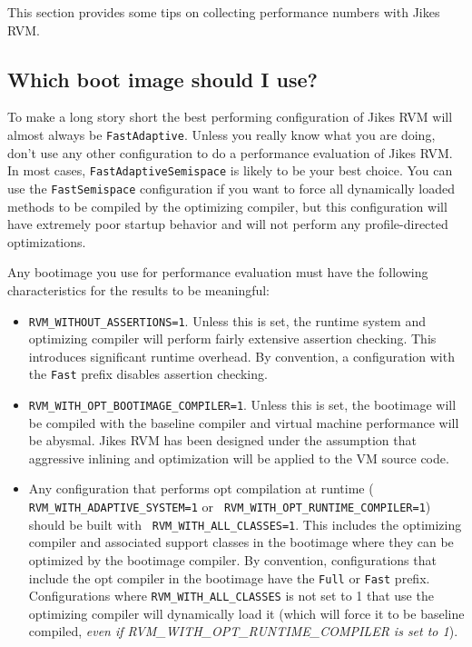 This section provides some tips on collecting performance numbers with
Jikes RVM.

\subsection{Which boot image should I use?}

To make a long story short the best performing configuration of Jikes
RVM will almost always be {\tt FastAdaptive}{\em<some GC>}.  Unless you really
know what you are doing, don't use any other configuration to do a 
performance evaluation of Jikes RVM. In most cases,
{\tt FastAdaptiveSemispace} is likely to be your best choice. You can
use the {\tt FastSemispace} configuration if you want to force all
dynamically loaded methods to be compiled by the optimizing compiler,
but this configuration will have extremely poor startup behavior and
will not perform any profile-directed optimizations. 

Any bootimage you use for performance evaluation must have the
following characteristics for the results to be meaningful:
\begin{itemize} 
\item {\tt RVM\_WITHOUT\_ASSERTIONS=1}. Unless this is set, the runtime
system and optimizing compiler will perform fairly extensive assertion
checking. This introduces significant runtime overhead. By convention,
a configuration with the {\tt Fast} prefix disables assertion
checking.
\item {\tt RVM\_WITH\_OPT\_BOOTIMAGE\_COMPILER=1}. Unless this is set, the
bootimage will be compiled with the baseline compiler and virtual
machine performance will be abysmal.  Jikes RVM has been designed
under the assumption that aggressive inlining and optimization will be
applied to the VM source code. 
\item Any configuration that performs opt compilation at runtime (
{\tt RVM\_WITH\_ADAPTIVE\_SYSTEM=1} or {\tt
RVM\_WITH\_OPT\_RUNTIME\_COMPILER=1}) should be built with {\tt
RVM\_WITH\_ALL\_CLASSES=1}.  This includes the optimizing compiler and
associated support classes in the bootimage where they can be
optimized by the bootimage compiler. By convention, configurations
that include the opt compiler in the bootimage have the {\tt Full} or
{\tt Fast} prefix.  Configurations where {\tt RVM\_WITH\_ALL\_CLASSES}
is not set to 1 that use the optimizing compiler will dynamically load
it (which will force it to be baseline compiled, {\em even if
RVM\_WITH\_OPT\_RUNTIME\_COMPILER is set to 1}).
\end{itemize}

